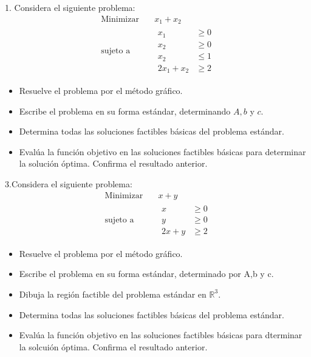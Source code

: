 \documentclass{article}
\begin{document}
1. Considera el siguiente problema:
\begin{equation*}
  \begin{aligned}
    \text{Minimizar}\quad  &   x_1+x_2 \\
    \text{sujeto a}\quad   &
    \begin{aligned}
      x_1     & \geq 0 \\
      x_2     & \geq 0 \\
      x_2     & \leq 1 \\
      2x_1+x_2  & \geq 2
    \end{aligned}
  \end{aligned}
\end{equation*}
\begin{itemize}
\item Resuelve el problema por el método gráfico.
\item Escribe el problema en su forma estándar, determinando $A, b$ y $c$.
\item Determina todas las soluciones factibles básicas del problema estándar.
\item Evalúa la función objetivo en las soluciones factibles básicas para determinar la solución óptima. Confirma el resultado anterior. 
\end{itemize}


3.Considera el siguiente problema:
\begin{equation*}
  \begin{aligned}
    \text{Minimizar}\quad & x+y \\
    \text{sujeto a}\quad &
    \begin{aligned}
      x & \geq 0 \\
      y & \geq 0 \\
      2x+y & \geq 2
    \end{aligned}
  \end{aligned}
\end{equation*}

\begin{itemize}
\item Resuelve el problema por el método gráfico.
\item Escribe el problema en su forma estándar, determinado por A,b y c.
\item Dibuja la región factible del problema estándar en $\mathbb{R}^3$.
\item Determina todas  las soluciones factibles básicas del problema estándar.
\item Evalúa la función objetivo en las soluciones factibles básicas para dterminar la solcuión óptima. Confirma el resultado anterior.
\end{itemize}
\end{document}

